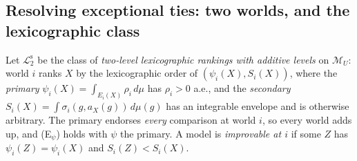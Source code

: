 \documentclass[11pt]{article}
\theoremstyle{definition}
\theoremstyle{remark}
\newcommand{\M}{\mathcal M}
\newcommand{\Ltwo}{\mathcal L_2^{\mathrm s}}
\begin{document}
\subsection{Resolving exceptional ties: two worlds, and the lexicographic class}\label{sec:M0-lex}

Let $\Ltwo$ be the class of \emph{two-level lexicographic rankings with additive levels} on $\M_U$: world $i$ ranks $X$ by the lexicographic order of $(\psi_i(X),S_i(X))$, where the \emph{primary} $\psi_i(X)=\int_{E_i(X)}\rho_i\,d\mu$ has $\rho_i>0$ a.e., and the \emph{secondary} $S_i(X)=\int\sigma_i(g,a_X(g))\,d\mu(g)$ has an integrable envelope and is otherwise arbitrary. The primary endorses \emph{every} comparison at world $i$, so every world adds up, and (E$_\psi$) holds with $\psi$ the primary. A model is \emph{improvable at $i$} if some $Z$ has $\psi_i(Z)=\psi_i(X)$ and $S_i(Z)<S_i(X)$.
\end{document}
